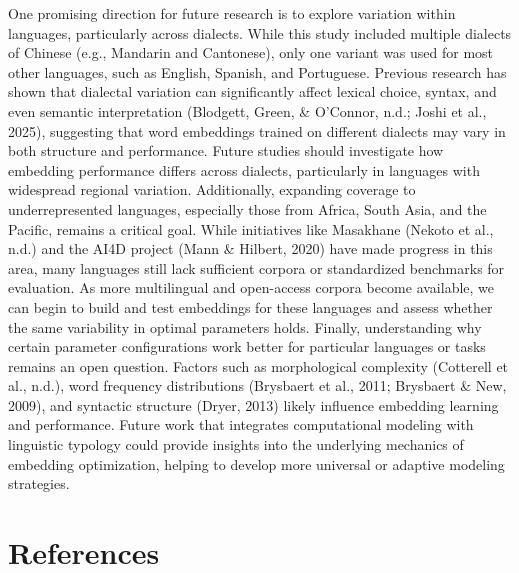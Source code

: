 \documentclass[
  english,
  man,floatsintext]{apa6}
\begin{document}
One promising direction for future research is to explore variation within languages, particularly across dialects. While this study included multiple dialects of Chinese (e.g., Mandarin and Cantonese), only one variant was used for most other languages, such as English, Spanish, and Portuguese. Previous research has shown that dialectal variation can significantly affect lexical choice, syntax, and even semantic interpretation (Blodgett, Green, \& O'Connor, n.d.; Joshi et al., 2025), suggesting that word embeddings trained on different dialects may vary in both structure and performance. Future studies should investigate how embedding performance differs across dialects, particularly in languages with widespread regional variation. Additionally, expanding coverage to underrepresented languages, especially those from Africa, South Asia, and the Pacific, remains a critical goal. While initiatives like Masakhane (Nekoto et al., n.d.) and the AI4D project (Mann \& Hilbert, 2020) have made progress in this area, many languages still lack sufficient corpora or standardized benchmarks for evaluation. As more multilingual and open-access corpora become available, we can begin to build and test embeddings for these languages and assess whether the same variability in optimal parameters holds. Finally, understanding why certain parameter configurations work better for particular languages or tasks remains an open question. Factors such as morphological complexity (Cotterell et al., n.d.), word frequency distributions (Brysbaert et al., 2011; Brysbaert \& New, 2009), and syntactic structure (Dryer, 2013) likely influence embedding learning and performance. Future work that integrates computational modeling with linguistic typology could provide insights into the underlying mechanics of embedding optimization, helping to develop more universal or adaptive modeling strategies.

\newpage

\section{References}\label{references}
\end{document}
